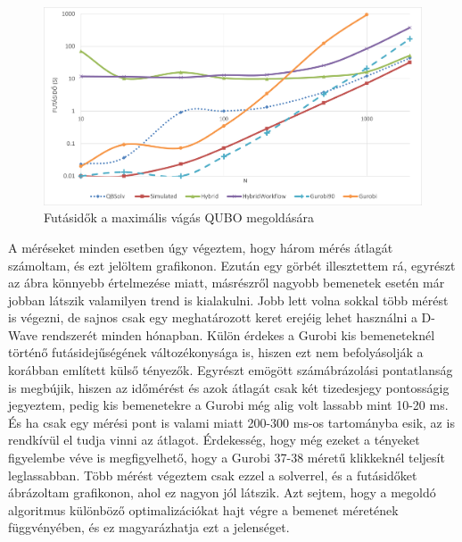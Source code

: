 \begin{figure}[!ht]
	\centering
	\includegraphics[width=150mm, keepaspectratio]{figures/diagrams/maxCutQUBO.png}
	\caption{Futásidők a maximális vágás QUBO megoldására}
	\label{fig:maxCutQUBO}
\end{figure}

A méréseket minden esetben úgy végeztem, hogy három mérés átlagát számoltam, és ezt jelöltem grafikonon. Ezután egy görbét illesztettem rá, egyrészt az ábra könnyebb értelmezése miatt, másrészről nagyobb bemenetek esetén már jobban látszik valamilyen trend is kialakulni. Jobb lett volna sokkal több mérést is végezni, de sajnos csak egy meghatározott keret erejéig lehet használni a D-Wave rendszerét minden hónapban. Külön érdekes a Gurobi kis bemeneteknél történő futásidejűségének változékonysága is, hiszen ezt nem befolyásolják a korábban említett külső tényezők. Egyrészt emögött számábrázolási pontatlanság is megbújik, hiszen az időmérést és azok átlagát csak két tizedesjegy pontosságig jegyeztem, pedig kis bemenetekre a Gurobi még alig volt lassabb mint 10-20 ms. És ha csak egy mérési pont is valami miatt 200-300 ms-os tartományba esik, az is rendkívül el tudja vinni az átlagot. Érdekesség, hogy még ezeket a tényeket figyelembe véve is megfigyelhető, hogy a Gurobi 37-38 méretű klikkeknél teljesít leglassabban. Több mérést végeztem csak ezzel a solverrel, és a futásidőket ábrázoltam  grafikonon, ahol ez nagyon jól látszik. Azt sejtem, hogy a megoldó algoritmus különböző optimalizációkat hajt végre a bemenet méretének függvényében, és ez magyarázhatja ezt a jelenséget.

